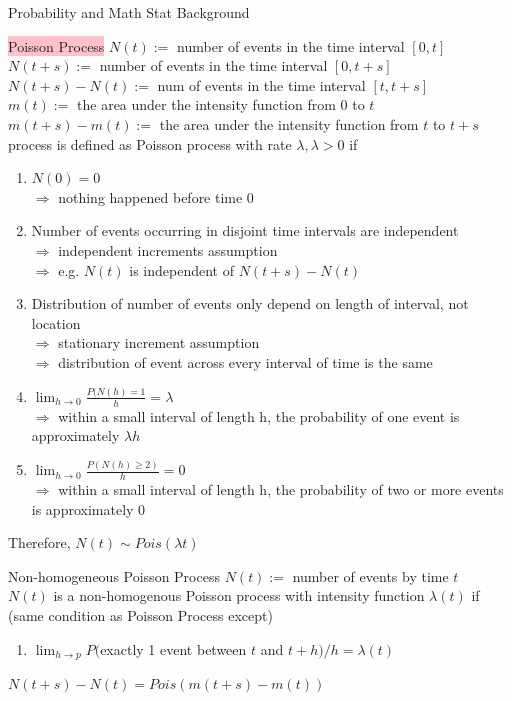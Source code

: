 \documentclass[a4paper,12pt,landscape]{article}
\begin{document}
\begin{multicols}{3}
\begin{section}{\small{Probability and Math Stat Background}}
    \begin{subsection}{\colorbox{pink}{Poisson Process}}
		$N(t) := $ number of events in the time interval $[0, t]$ \\
		$N(t+s) :=$ number of events in the time interval $[0, t+s]$ \\
		$N(t+s) - N(t) :=$ num of events in the time interval $[t, t+s]$ \\
		$m(t) :=$ the area under the intensity function from $0$ to $t$ \\
		$m(t+s) - m(t) :=$ the area under the intensity function from $t$ to $t+s$ \\
		process is defined as Poisson process with rate $\lambda, \lambda > 0$ if \\
		\begin{enumerate}
			\item $N(0) = 0$ \\
				$\Rightarrow$ nothing happened before time 0
			\item Number of events occurring in disjoint time intervals are independent \\
				$\Rightarrow$ independent increments assumption\\ $\Rightarrow$ e.g. $N(t)$ is independent of $N(t+s) - N(t)$
			\item Distribution of number of events only depend on length of interval, not location \\
				$\Rightarrow$ stationary increment assumption \\
				$\Rightarrow$ distribution of event across every interval of time is the same
			\item $\lim_{h\rightarrow 0} \frac{P(N(h) = 1}{h} = \lambda $ \\
				$\Rightarrow$ within a small interval of length h, the probability of one event is approximately $\lambda h$
			\item $\lim_{h\rightarrow 0} \frac{P(N(h) \geq 2)}{h} = 0$ \\
				$\Rightarrow$ within a small interval of length h, the probability of two or more events is approximately 0
		\end{enumerate}
		Therefore, $N(t) \sim Pois(\lambda t)$
		
		\begin{subsubsection}{Non-homogeneous Poisson Process}
			$N(t) :=$ number of events by time $t$\\
			$N(t)$ is a non-homogenous Poisson process with intensity function $\lambda (t)$ if \\
			(same condition as Poisson Process except) \\
			\begin{enumerate}
				\item $\lim_{h\rightarrow p}P($exactly 1 event between $t$ and $t+h)/h=\lambda (t)$
			\end{enumerate}
			$N(t+s) - N(t) = Pois(m(t+s) - m(t))$
		\end{subsubsection}


\end{subsection}
\end{section}
\end{multicols}
\end{document}
